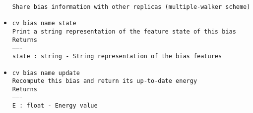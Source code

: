 \begin{itemize}
\\
\texttt{Share bias information with other replicas (multiple-walker scheme)}
\item \texttt{cv bias name state}
\\
\texttt{Print a string representation of the feature state of this bias}
\\
\texttt{Returns}
\\
\texttt{-------}
\\
\texttt{state : string - String representation of the bias features}
\item \texttt{cv bias name update}
\\
\texttt{Recompute this bias and return its up-to-date energy}
\\
\texttt{Returns}
\\
\texttt{-------}
\\
\texttt{E : float - Energy value}
\end{itemize}
